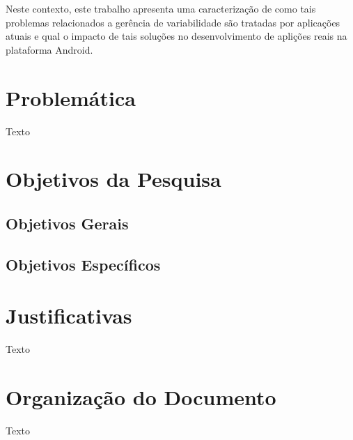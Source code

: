 Neste contexto, este trabalho apresenta uma caracterização de como tais problemas
relacionados a gerência de variabilidade são tratadas por aplicações atuais e
qual o impacto de tais soluções no desenvolvimento de aplições reais na plataforma
Android.

\section{Problemática}

Texto

\section{Objetivos da Pesquisa}

\subsection{Objetivos Gerais}

\subsection{Objetivos Específicos}

\section{Justificativas}

Texto

\section{Organização do Documento}

Texto
